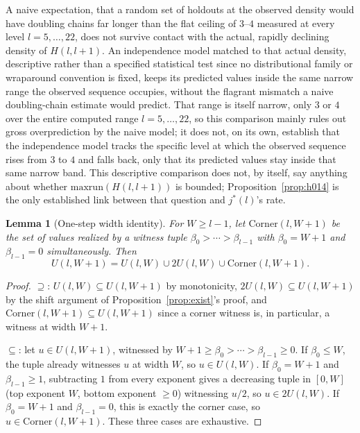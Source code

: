\documentclass[11pt]{amsart}
\theoremstyle{plain}
\newtheorem{lemma}[theorem]{Lemma}
\theoremstyle{definition}
\theoremstyle{remark}
\begin{document}
A naive expectation, that a random set of holdouts at the observed density would have doubling
chains far longer than the flat ceiling of $3$--$4$ measured at every level $l=5,\dots,22$, does not
survive contact with the actual, rapidly declining density of $H(l,l+1)$. An independence model
matched to that actual density, descriptive rather than a specified statistical test since no
distributional family or wraparound convention is fixed, keeps its predicted values inside the same
narrow range the observed sequence occupies, without the flagrant mismatch a naive doubling-chain
estimate would predict. That range is
itself narrow, only $3$ or $4$ over the entire computed range $l=5,\dots,22$, so this comparison
mainly rules out gross overprediction by the naive model; it does not, on its own, establish that the
independence model tracks the specific level at which the observed sequence rises from $3$ to $4$
and falls back, only that its predicted values stay inside that same narrow band. This descriptive
comparison does not,
by itself, say anything about whether
$\mathrm{maxrun}(H(l,l+1))$ is bounded;
Proposition~\ref{prop:h014} is the only established link between that question and $j^*(l)$'s rate.

\begin{lemma}[One-step width identity]
\label{lem:width}
For $W\ge l-1$, let $\mathrm{Corner}(l,W+1)$ be the set of values realized by a witness tuple
$\beta_0>\cdots>\beta_{l-1}$ with $\beta_0=W+1$ and $\beta_{l-1}=0$ simultaneously. Then
\[
U(l,W+1) = U(l,W) \cup 2U(l,W) \cup \mathrm{Corner}(l,W+1).
\]
\end{lemma}

\begin{proof}
$\supseteq$: $U(l,W)\subseteq U(l,W+1)$ by monotonicity, $2U(l,W)\subseteq U(l,W+1)$ by the shift
argument of Proposition~\ref{prop:exist}'s proof, and $\mathrm{Corner}(l,W+1)\subseteq U(l,W+1)$
since a corner witness is, in particular, a witness at width $W+1$.

$\subseteq$: let $u\in U(l,W+1)$, witnessed by $W+1\ge\beta_0>\cdots>\beta_{l-1}\ge0$. If
$\beta_0\le W$, the tuple already witnesses $u$ at width $W$, so $u\in U(l,W)$. If $\beta_0=W+1$ and
$\beta_{l-1}\ge1$, subtracting $1$ from every exponent gives a decreasing tuple in $[0,W]$
(top exponent $W$, bottom exponent $\ge0$) witnessing $u/2$, so $u\in2U(l,W)$. If $\beta_0=W+1$ and
$\beta_{l-1}=0$, this is exactly the corner case, so $u\in\mathrm{Corner}(l,W+1)$. These three cases
are exhaustive.
\end{proof}
\end{document}
